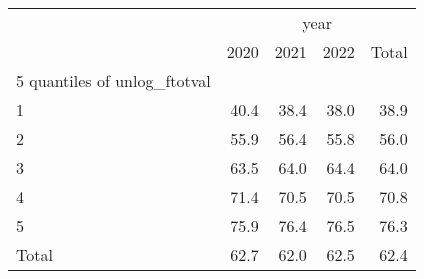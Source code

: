 \begin{tabular}{lllll}
\cline{1-5}
\multicolumn{1}{c}{} &
  \multicolumn{4}{|c}{year} \\
\multicolumn{1}{c}{} &
  \multicolumn{1}{|r}{2020} &
  \multicolumn{1}{r}{2021} &
  \multicolumn{1}{r}{2022} &
  \multicolumn{1}{r}{Total} \\
\cline{1-5}
\multicolumn{1}{l}{5 quantiles of unlog\_ftotval} &
  \multicolumn{1}{|r}{} &
  \multicolumn{1}{r}{} &
  \multicolumn{1}{r}{} &
  \multicolumn{1}{r}{} \\
\multicolumn{1}{l}{\hspace{1em}1} &
  \multicolumn{1}{|r}{40.4} &
  \multicolumn{1}{r}{38.4} &
  \multicolumn{1}{r}{38.0} &
  \multicolumn{1}{r}{38.9} \\
\multicolumn{1}{l}{\hspace{1em}2} &
  \multicolumn{1}{|r}{55.9} &
  \multicolumn{1}{r}{56.4} &
  \multicolumn{1}{r}{55.8} &
  \multicolumn{1}{r}{56.0} \\
\multicolumn{1}{l}{\hspace{1em}3} &
  \multicolumn{1}{|r}{63.5} &
  \multicolumn{1}{r}{64.0} &
  \multicolumn{1}{r}{64.4} &
  \multicolumn{1}{r}{64.0} \\
\multicolumn{1}{l}{\hspace{1em}4} &
  \multicolumn{1}{|r}{71.4} &
  \multicolumn{1}{r}{70.5} &
  \multicolumn{1}{r}{70.5} &
  \multicolumn{1}{r}{70.8} \\
\multicolumn{1}{l}{\hspace{1em}5} &
  \multicolumn{1}{|r}{75.9} &
  \multicolumn{1}{r}{76.4} &
  \multicolumn{1}{r}{76.5} &
  \multicolumn{1}{r}{76.3} \\
\multicolumn{1}{l}{\hspace{1em}Total} &
  \multicolumn{1}{|r}{62.7} &
  \multicolumn{1}{r}{62.0} &
  \multicolumn{1}{r}{62.5} &
  \multicolumn{1}{r}{62.4} \\
\cline{1-5}
\end{tabular}
